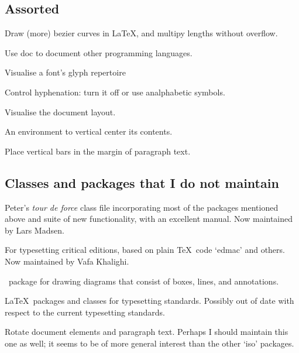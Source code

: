 \documentclass{ltugboat}
\begin{document}
\subsection{Assorted}

\begin{description}[font=\normalfont\sffamily]
\item [bez123 \& multiply] Draw (more) bezier curves in \LaTeX, and multipy lengths without overflow.
\item [docmfp] Use \textsf{doc} to document other programming languages.
\item [fonttable] Visualise a font's glyph repertoire
\item [hyphenat] Control hyphenation: turn it off or use analphabetic symbols.
\item [layouts] Visualise the document layout.
\item [midpage] An environment to vertical center its contents.
\item [vertbars] Place vertical bars in the margin of paragraph text.
\end{description}


\subsection{Classes and packages that I do not maintain}

\begin{description}[font=\normalfont\sffamily]
\item [memoir] Peter's \emph{tour de force} class file incorporating most of the packages mentioned above and suite of new functionality, with an excellent manual. Now maintained by Lars Madsen.
\item [ledmac/ledpar/ledarab]  For typesetting critical editions, based on plain \TeX\ code `\textsf{edmac}' and others. Now maintained by Vafa Khalighi.
\item [expressg] \MP\ package for drawing diagrams that consist of boxes, lines, and annotations.
\item [iso \& iso10303] \LaTeX\ packages and classes for typesetting  standards. Possibly out of date with respect to the current typesetting standards.
\item [isorot] Rotate document elements and paragraph text. Perhaps I should maintain this one as well; it seems to be of more general interest than the other `\textsf{iso}' packages.
\end{description}
\end{document}
